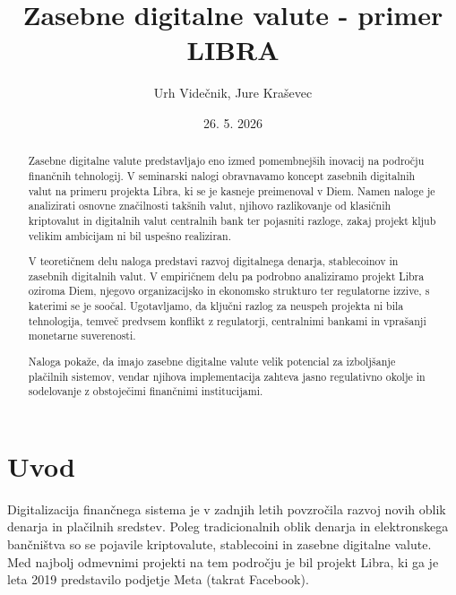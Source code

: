 \documentclass[12pt,a4paper]{article}
\begin{document}

\setlength{\parskip}{\baselineskip}
\setlength{\parindent}{0pt}
\sloppy

\title{Zasebne digitalne valute - primer LIBRA}
\author{Urh Videčnik, Jure Kraševec}
\date{26. 5. 2026}
\maketitle

\begin{abstract}
Zasebne digitalne valute predstavljajo eno izmed pomembnejših inovacij na področju finančnih tehnologij. V seminarski nalogi obravnavamo koncept zasebnih digitalnih valut na primeru projekta Libra, ki se je kasneje preimenoval v Diem. Namen naloge je analizirati osnovne značilnosti takšnih valut, njihovo razlikovanje od klasičnih kriptovalut in digitalnih valut centralnih bank ter pojasniti razloge, zakaj projekt kljub velikim ambicijam ni bil uspešno realiziran.

V teoretičnem delu naloga predstavi razvoj digitalnega denarja, stablecoinov in zasebnih digitalnih valut. V empiričnem delu pa podrobno analiziramo projekt Libra oziroma Diem, njegovo organizacijsko in ekonomsko strukturo ter regulatorne izzive, s katerimi se je soočal. Ugotavljamo, da ključni razlog za neuspeh projekta ni bila tehnologija, temveč predvsem konflikt z regulatorji, centralnimi bankami in vprašanji monetarne suverenosti.

Naloga pokaže, da imajo zasebne digitalne valute velik potencial za izboljšanje plačilnih sistemov, vendar njihova implementacija zahteva jasno regulativno okolje in sodelovanje z obstoječimi finančnimi institucijami.
\end{abstract}

\newpage

\begingroup
\setlength{\parskip}{5pt}
\tableofcontents
\endgroup

\newpage


\section{Uvod}

Digitalizacija finančnega sistema je v zadnjih letih povzročila razvoj novih oblik denarja in plačilnih sredstev. Poleg tradicionalnih oblik denarja in elektronskega bančništva so se pojavile kriptovalute, stablecoini in zasebne digitalne valute. Med najbolj odmevnimi projekti na tem področju je bil projekt Libra, ki ga je leta 2019 predstavilo podjetje Meta (takrat Facebook).
\end{document}

